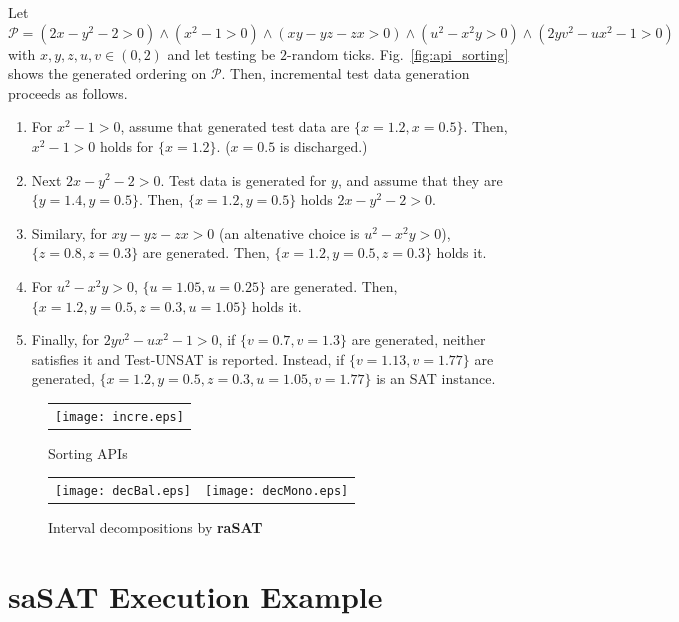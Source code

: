 \documentclass[runningheads,a4paper,oribibl]{llncs}
\begin{document}
\begin{example} \label{ex:inctest}
Let 
${\mathcal P} = (2x - y^2-2>0) \wedge (x^2 -1>0) \wedge (xy - yz - zx > 0) \wedge 
(u^2 - x^2y > 0) \wedge (2yv^2 - ux^2 - 1 > 0)$ 
with $x,y,z,u,v \in (0,2)$ and let testing be $2$-random ticks. 
Fig.~\ref{fig:api_sorting} shows the generated ordering on ${\mathcal P}$. 
Then, incremental test data generation proceeds as follows. 
\begin{enumerate}
\item For $x^2 - 1 > 0$, 
assume that generated test data are $\{x=1.2, x = 0.5\}$. Then, $x^2 - 1 > 0$ holds for $\{x = 1.2\}$.
($x = 0.5$ is discharged.) 
\item Next $2x - y^2-2>0$. Test data is generated for $y$, and assume that they are $\{y=1.4, y = 0.5\}$.
Then, $\{x = 1.2, y = 0.5\}$ holds $2x - y^2-2>0$. 
\item Similary, for $xy - yz - zx > 0$ (an altenative choice is $u^2 - x^2y > 0$), 
$\{z=0.8, z=0.3\}$ are generated. Then, $\{x = 1.2, y = 0.5, z = 0.3\}$ holds it. 
\item For $u^2 - x^2y > 0$, $\{u=1.05, u=0.25\}$ are generated. 
Then, $\{x = 1.2, y = 0.5, z = 0.3, u = 1.05\}$ holds it. 
\item Finally, for $2yv^2 - ux^2 - 1 > 0$, if $\{v=0.7, v=1.3\}$ are generated, 
neither satisfies it and Test-UNSAT is reported. 
Instead, if $\{v=1.13, v=1.77\}$ are generated, 
$\{x = 1.2, y = 0.5, z = 0.3, u = 1.05, v = 1.77\}$ is an SAT instance. 
\end{enumerate} 
\end{example} 

\begin{figure}
\centering
\begin{minipage}[b]{0.45\linewidth}
\begin{tabular}{l}
  \texttt{[image: incre.eps]}
\end{tabular}
\caption{Sorting APIs}
\label{fig:api_sorting}
\end{minipage}
\begin{minipage}[b]{0.45\linewidth}
\begin{tabular}{ll}
\texttt{[image: decBal.eps]}&
\texttt{[image: decMono.eps]}
\end{tabular}
\caption{Interval decompositions by {\bf raSAT}}
\label{fig:example}
\end{minipage}
\end{figure}


\section{{\bf saSAT} Execution Example} \label{app:raSATexample}
\end{document}
